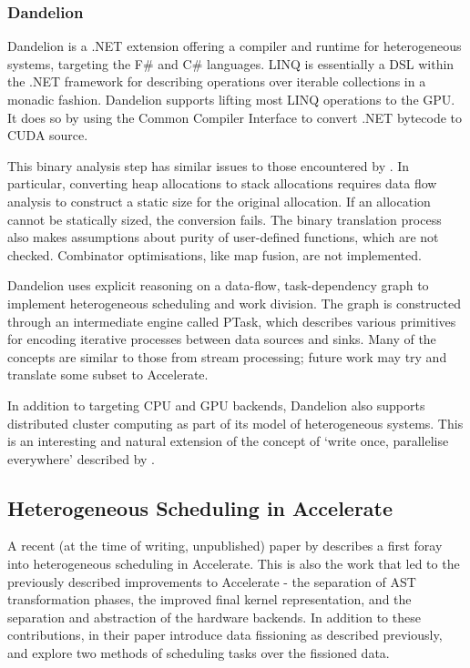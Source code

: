\documentclass[a4paper,12pt]{article}
\begin{document}
\subsubsection*{Dandelion}
Dandelion is a .NET extension offering a compiler and runtime for heterogeneous systems, targeting the F\# and C\# languages. \citep{rossbach_dandelion:_2013}
LINQ is essentially a DSL within the .NET framework for describing operations over iterable collections in a monadic fashion.
Dandelion supports lifting most LINQ operations to the GPU.
It does so by using the Common Compiler Interface to convert .NET bytecode to CUDA source.

This binary analysis step has similar issues to those encountered by \citet{lee_transparent_2013}.
In particular, converting heap allocations to stack allocations requires data flow analysis to construct a static size for the original allocation.
If an allocation cannot be statically sized, the conversion fails.
The binary translation process also makes assumptions about purity of user-defined functions, which are not checked.
Combinator optimisations, like map fusion, are not implemented.

Dandelion uses explicit reasoning on a data-flow, task-dependency graph to implement heterogeneous scheduling and work division.
The graph is constructed through an intermediate engine called PTask, which describes various primitives for encoding iterative processes between data sources and sinks.
Many of the concepts are similar to those from stream processing; future work may try and translate some subset to Accelerate.

In addition to targeting CPU and GPU backends, Dandelion also supports distributed cluster computing as part of its model of heterogeneous systems.
This is an interesting and natural extension of the concept of `write once, parallelise everywhere' described by \citet{newton_converting_2014}.

\subsection{Heterogeneous Scheduling in Accelerate}
A recent (at the time of writing, unpublished) paper by \citet*{newton_converting_2014} describes a first foray into heterogeneous scheduling in Accelerate.
This is also the work that led to the previously described improvements to Accelerate - the separation of AST transformation phases, the improved final kernel representation, and the separation and abstraction of the hardware backends. 
In addition to these contributions, in their paper  \citeauthor{newton_converting_2014} introduce data fissioning as described previously, and explore two methods of scheduling tasks over the fissioned data.
\end{document}

